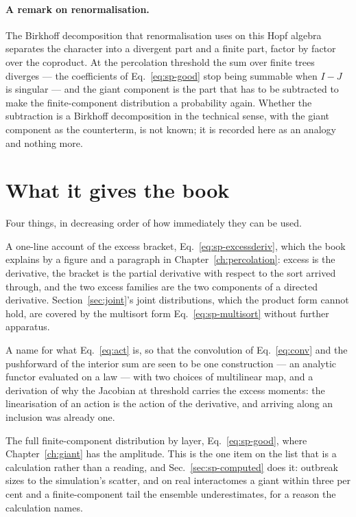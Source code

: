 \paragraph{A remark on renormalisation.} The Birkhoff decomposition that
renormalisation uses on this Hopf algebra separates the character into a
divergent part and a finite part, factor by factor over the coproduct. At
the percolation threshold the sum over finite trees diverges --- the
coefficients of Eq.~\eqref{eq:sp-good} stop being summable when $I-J$ is
singular --- and the giant component is the part that has to be subtracted
to make the finite-component distribution a probability again. Whether the
subtraction is a Birkhoff decomposition in the technical sense, with the
giant component as the counterterm, is not known; it is recorded here as an
analogy and nothing more.

\section{What it gives the book}
\label{sec:sp-gives}

Four things, in decreasing order of how immediately they can be used.

A one-line account of the excess bracket,
Eq.~\eqref{eq:sp-excessderiv}, which the book explains by a figure and a
paragraph in Chapter~\ref{ch:percolation}: excess is the derivative, the
bracket is the partial derivative with respect to the sort arrived through,
and the two excess families are the two components of a directed derivative.
Section~\ref{sec:joint}'s joint distributions, which the product form cannot
hold, are covered by the multisort form Eq.~\eqref{eq:sp-multisort} without
further apparatus.

A name for what Eq.~\eqref{eq:act} is, so that the convolution of
Eq.~\eqref{eq:conv} and the pushforward of the interior sum are seen to be
one construction --- an analytic functor evaluated on a law --- with two
choices of multilinear map, and a derivation of why the Jacobian at threshold
carries the excess moments: the linearisation of an action is the action of
the derivative, and arriving along an inclusion was already one.

The full finite-component distribution by layer, Eq.~\eqref{eq:sp-good},
where Chapter~\ref{ch:giant} has the amplitude. This is the one item on the
list that is a calculation rather than a reading, and Sec.~\ref{sec:sp-computed}
does it: outbreak sizes to the simulation's scatter, and on real
interactomes a giant within three per cent and a finite-component tail the
ensemble underestimates, for a reason the calculation names.

